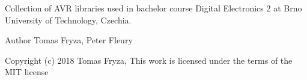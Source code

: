 Collection of A\+VR libraries used in bachelor course Digital Electronics 2 at Brno University of Technology, Czechia.

\begin{DoxyAuthor}{Author}
Tomas Fryza, Peter Fleury 
\end{DoxyAuthor}
\begin{DoxyCopyright}{Copyright}
(c) 2018 Tomas Fryza, This work is licensed under the terms of the M\+IT license 
\end{DoxyCopyright}
